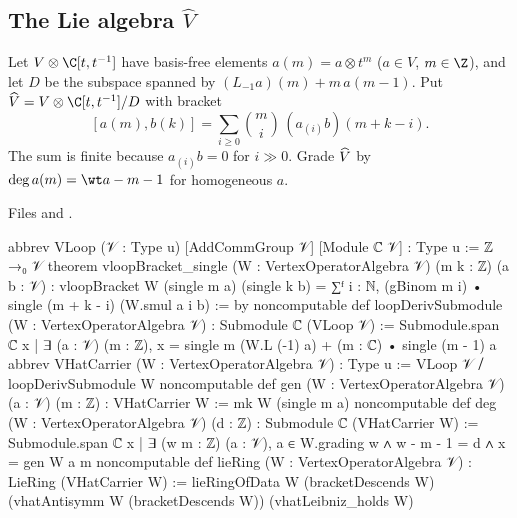 \subsection{The Lie algebra \texorpdfstring{$\widehat V$}{V-hat}}

\begin{definition}\label{l13:def:vhat}
Let $V\otimes\C[t,t^{-1}]$ have basis-free elements $a(m) = a\otimes t^m$ ($a\in V$, $m\in\Z$), and let $D$ be the subspace
spanned by $(L_{-1}a)(m) + m\,a(m-1)$. Put $\lthirteenVh = V\otimes\C[t,t^{-1}]/D$ with bracket
\begin{equation}\label{l13:eq:bracket}
 [a(m),b(k)] = \sum_{i\ge0}\binom mi\,(a_{(i)}b)(m+k-i).
\end{equation}
The sum is finite because $a_{(i)}b = 0$ for $i\gg0$. Grade $\widehat{V}$ by $\deg a(m) = \wt a - m - 1$ for homogeneous
$a$.
\end{definition}
\noindent Files  and
.
\begin{leancode}
abbrev VLoop (𝒱 : Type u) [AddCommGroup 𝒱] [Module ℂ 𝒱] : Type u := ℤ →₀ 𝒱
theorem vloopBracket_single (W : VertexOperatorAlgebra 𝒱) (m k : ℤ) (a b : 𝒱) :
    vloopBracket W (single m a) (single k b)
      = ∑ᶠ i : ℕ, (gBinom m i) • single (m + k - i) (W.smul a i b) := by
noncomputable def loopDerivSubmodule (W : VertexOperatorAlgebra 𝒱) : Submodule ℂ (VLoop 𝒱) :=
  Submodule.span ℂ {x | ∃ (a : 𝒱) (m : ℤ),
    x = single m (W.L (-1) a) + (m : ℂ) • single (m - 1) a}
abbrev VHatCarrier (W : VertexOperatorAlgebra 𝒱) : Type u := VLoop 𝒱 ⧸ loopDerivSubmodule W
noncomputable def gen (W : VertexOperatorAlgebra 𝒱) (a : 𝒱) (m : ℤ) : VHatCarrier W :=
  mk W (single m a)
noncomputable def deg (W : VertexOperatorAlgebra 𝒱) (d : ℤ) : Submodule ℂ (VHatCarrier W) :=
  Submodule.span ℂ {x | ∃ (w m : ℤ) (a : 𝒱), a ∈ W.grading w ∧ w - m - 1 = d ∧ x = gen W a m}
noncomputable def lieRing (W : VertexOperatorAlgebra 𝒱) : LieRing (VHatCarrier W) :=
  lieRingOfData W (bracketDescends W)
    (vhatAntisymm W (bracketDescends W)) (vhatLeibniz_holds W)
\end{leancode}

